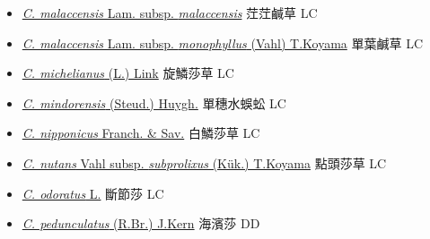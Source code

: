 \begin{itemize}
\begin{itemize}
        \item[] \href{http://www.theplantlist.org/tpl1.1/search?q=Cyperus+malaccensis+subsp.+malaccensis}{\textit{C. malaccensis} Lam. subsp. \textit{malaccensis}}   茳茳鹹草 LC
        \item[] \href{http://www.theplantlist.org/tpl1.1/search?q=Cyperus+malaccensis+subsp.+monophyllus}{\textit{C. malaccensis} Lam. subsp. \textit{monophyllus} (Vahl) T.Koyama}   單葉鹹草 LC
        \item[] \href{http://www.theplantlist.org/tpl1.1/search?q=Cyperus+michelianus}{\textit{C. michelianus} (L.) Link}   旋鱗莎草 LC
        \item[] \href{http://www.theplantlist.org/tpl1.1/search?q=Cyperus+mindorensis}{\textit{C. mindorensis} (Steud.) Huygh.}     單穗水蜈蚣 LC
        \item[] \href{http://www.theplantlist.org/tpl1.1/search?q=Cyperus+nipponicus}{\textit{C. nipponicus} Franch. \& Sav.}   白鱗莎草 LC
        \item[] \href{http://www.theplantlist.org/tpl1.1/search?q=Cyperus+nutans+subsp.+subprolixus}{\textit{C. nutans} Vahl subsp. \textit{subprolixus} (Kük.) T.Koyama}   點頭莎草 LC
        \item[] \href{http://www.theplantlist.org/tpl1.1/search?q=Cyperus+odoratus}{\textit{C. odoratus} L.}     斷節莎 LC
        \item[] \href{http://www.theplantlist.org/tpl1.1/search?q=Cyperus+pedunculatus}{\textit{C. pedunculatus} (R.Br.) J.Kern}     海濱莎 DD

\end{itemize}
\end{itemize}
